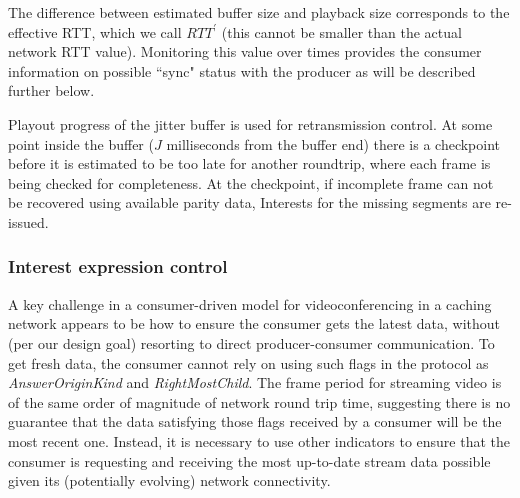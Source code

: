\documentclass{icn/sig-alternate-2013} %
\begin{document}
The difference between estimated buffer size and playback size corresponds to the effective RTT, which we call $RTT^{\prime}$ (this cannot be smaller than the actual network RTT value). %
Monitoring this value over times provides the consumer information on possible ``sync" status with the producer as will be described further below. %

Playout progress of the jitter buffer is used for retransmission control. %
At some point inside the buffer ($J$ milliseconds from the buffer end) there is a checkpoint before it is estimated to be too late for another roundtrip, where each frame is being checked for completeness. At the checkpoint, if incomplete frame can not be recovered using available parity data, Interests for the missing segments are re-issued. 

\subsubsection{Interest expression control}


A key challenge in a consumer-driven model for videoconferencing in a caching network appears to be how to ensure the consumer gets the latest data, without (per our design goal) resorting to direct producer-consumer communication.
To get fresh data, the consumer cannot rely on using such flags in the protocol as \textit{AnswerOriginKind} and \textit{RightMostChild}. The frame period for  streaming video is of the same order of magnitude of network round trip time, suggesting there is no guarantee that the data satisfying those flags received by a consumer will be the most recent one. Instead, it is necessary to use other indicators to ensure that the consumer is requesting and receiving the most up-to-date stream data possible given its (potentially evolving) network connectivity. 
\end{document}
